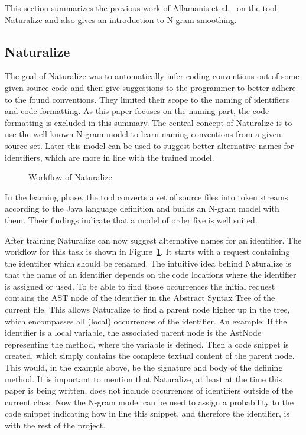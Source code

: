 This section summarizes the previous work of Allamanis et al.~\cite{naturalize} on the tool Naturalize and also gives an introduction to N-gram smoothing.
\subsection{Naturalize}
The goal of Naturalize was to automatically infer coding conventions out of some given source code
and then give suggestions to the programmer to better adhere to the found conventions.
They limited their scope to the naming of identifiers and code formatting. 
As this paper focuses on the naming part, the code formatting is excluded in this summary. 
The central concept of Naturalize is to use the well-known N-gram model to learn naming conventions from a given source set. Later this model can be used to suggest better alternative names for identifiers, which are more in line with the trained model. 
\begin{figure}
    \centering
    \graphicspath{{resources/}}  
    \def\svgwidth{0.5\textwidth}
    
    \caption{Workflow of Naturalize}
    \label{fig:back_nat_workflow}
\end{figure}

In the learning phase, the tool converts a set of source files into token streams according to the
Java language definition and builds an N-gram model with them. Their findings indicate that a model of
order five is well suited.

After training Naturalize can now suggest alternative names for an identifier. The workflow for this task is shown in Figure~\ref{fig:back_nat_workflow}.
It starts with a request containing the identifier which should be renamed.
The intuitive idea behind Naturalize is that the name of an identifier depends on the code locations where the identifier is assigned or used. To be able to find those occurrences the initial request contains the AST node of the identifier in the Abstract Syntax Tree
of the current file. This allows Naturalize to find a parent node higher up in the tree, which encompasses all (local) occurrences of the identifier. An example: If the identifier is a local variable, the associated parent node is the AstNode representing the method, where the variable is defined. Then a code snippet is created, which simply contains the complete textual content of the parent node. This would, in the example above, be the signature and body of the defining method. It is important to mention that Naturalize, at least at the time this paper is being written,
does not include occurrences of identifiers outside of the current class. Now the N-gram model can be used to assign a probability to the code snippet indicating how in line this snippet, and therefore the identifier, is with the rest of the project.

